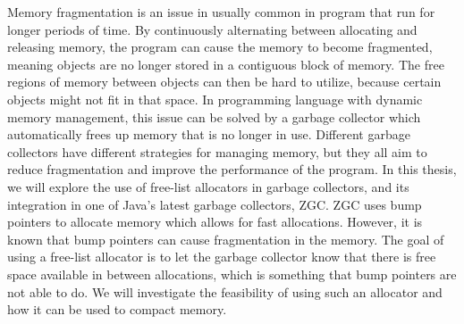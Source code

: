 
Memory fragmentation is an issue in usually common in program that run for longer periods of time. By continuously alternating between allocating and releasing memory, the program can cause the memory to become fragmented, meaning objects are no longer stored in a contiguous block of memory. The free regions of memory between objects can then be hard to utilize, because certain objects might not fit in that space. In programming language with dynamic memory management, this issue can be solved by a garbage collector which automatically frees up memory that is no longer in use. Different garbage collectors have different strategies for managing memory, but they all aim to reduce fragmentation and improve the performance of the program. In this thesis, we will explore the use of free-list allocators in garbage collectors, and its integration in one of Java's latest garbage collectors, ZGC. ZGC uses bump pointers to allocate memory which allows for fast allocations. However, it is known that bump pointers can cause fragmentation in the memory. The goal of using a free-list allocator is to let the garbage collector know that there is free space available in between allocations, which is something that bump pointers are not able to do. We will investigate the feasibility of using such an allocator and how it can be used to compact memory.